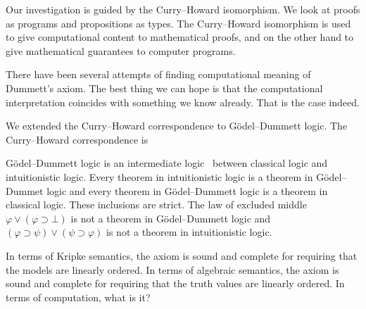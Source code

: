 
Our investigation is guided by the Curry--Howard isomorphism.
We look at proofs as programs and propositions as types.
The Curry--Howard isomorphism is used to give computational content
to mathematical proofs, and on the other hand to give mathematical
guarantees to computer programs.


There have been several attempts of finding computational meaning of
Dummett's axiom.  
The best thing we can hope is that the computational
interpretation coincides with something we know already.
That is the case indeed.

We extended the Curry--Howard correspondence to G\"odel--Dummett logic.
The Curry--Howard correspondence is 

G\"odel--Dummett logic is an intermediate logic~\citep{umezawa} between
classical logic and intuitionistic logic.  Every theorem in
intuitionistic logic is a theorem in G\"odel--Dummet logic and every
theorem in G\"odel--Dummett logic is a theorem in classical logic.
These inclusions are strict.  The law of excluded middle
$\varphi\vee(\varphi\supset \bot)$ is not a theorem in G\"odel--Dummett
logic and $(\varphi\supset\psi)\vee(\psi\supset\varphi)$ is not a
theorem in intuitionistic logic.

In terms of Kripke semantics, the axiom is sound and complete for
requiring that the models are linearly ordered.
In terms of algebraic semantics, the axiom is sound and complete for
requiring that the truth values are linearly ordered.
In terms of computation, what is it?

